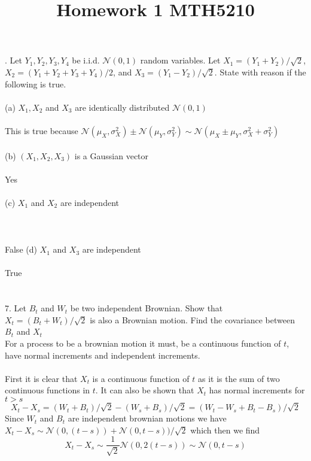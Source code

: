\documentclass{article}
\title{Homework 1 MTH5210}
\begin{document}
\maketitle
{}. Let $Y_1, Y_2, Y_3, Y_4$ be i.i.d. $\mathcal{N}(0, 1)$ random variables.
Let $X_1 = (Y_1 + Y_2)/\sqrt2$, $X_2  = (Y_1 + Y_2 + Y_3 +Y_4)/2$, and 
$X_3 = (Y_1 - Y_2)/\sqrt2$. State with reason if the following is true. \\ \\
(a) $X_1, X_2$ and $X_3$ are identically distributed $\mathcal{N}(0, 1)$ \\ \\
This is true because $\mathcal{N}(\mu_X, \sigma_X^2) \pm \mathcal{N}(\mu_Y, \sigma_Y^2) \sim \mathcal{N}(\mu_X \pm \mu_Y, \sigma_X^2 +\sigma_Y^2)$ 
\\\\
(b) $(X_1, X_2, X_3)$ is a Gaussian vector \\\\
Yes
\\ \\
(c) $X_1$ and $X_2$ are independent \\ \\
\\ \\
False
(d) $X_1$ and $X_3$ are independent \\ \\
True
\\ \\ \\
7. Let $B_t$ and $W_t$ be two independent Brownian. Show that $X_t = (B_t + W_t)/\sqrt2$ is also a Brownian motion.
Find the covariance between $B_t$ and $X_t$
\\
For a process to be a brownian motion it must, be a continuous function of $t$, have normal increments and independent increments. \\ \\
First it is clear that $X_t$ is a continuous function of $t$ as it is the sum of two continuous functions in $t$. It can also be shown that
$X_t$ has normal increments for $t>s$
\begin{equation*} 
    X_t - X_s = (W_t + B_t)/\sqrt2 - (W_s + B_s)/\sqrt2 = (W_t - W_s + B_t - B_s)/\sqrt2 
 \end{equation*} 
Since $W_t$ and $B_t$ are independent brownian motions we have $X_t - X_s \sim \mathcal{N}(0, (t-s)) + \mathcal{N}(0, t-s))/\sqrt2 $ which then we find
\begin{equation*} 
   X_t - X_s \sim \frac{1}{\sqrt2} \mathcal{N}(0, 2(t-s)) \sim \mathcal{N}(0, t-s)
 \end{equation*} 
\end{document}
